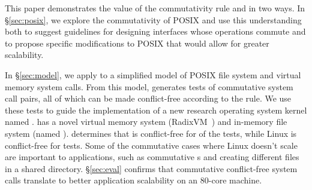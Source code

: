 This paper demonstrates the value of the commutativity rule and \tool
in two ways.
In \S\ref{sec:posix}, we explore the commutativity of POSIX
and use this
understanding both to suggest 
guidelines for designing interfaces
whose operations commute and
to propose specific modifications to POSIX
that would allow for greater scalability.

In \S\ref{sec:model}, we apply \tool to a simplified model of
 POSIX file system and virtual memory system
calls.
%
From this model,
\tool generates  tests of commutative
system call pairs, all of which can be made conflict-free
according to the rule.  We use these tests to
guide the implementation of a new research operating system kernel
named \sys.  \sys has a novel virtual memory system
(RadixVM~\cite{clements:radixvm}) and in-memory file
system (named \fs).  \tool determines that \sys is conflict-free for
 of the
 tests, while Linux is conflict-free
for 
tests.  Some of the commutative cases where Linux doesn't scale are important
to applications, such as commutative
s and creating different files in a shared directory.
\S\ref{sec:eval} confirms that commutative conflict-free system calls
translate to better application scalability on an 80-core machine.




\begin{comment}
The contributions of the paper are as follows:
\begin{CompactItemize}

\item The commutativity rule;

\item The \tool{} tool;

\item \fs: a case study of using \tool to design a scalable file system;

\item A scalability evaluation with microbenchmarks and one application on an
  80-core machine.

\end{CompactItemize}
\end{comment}

